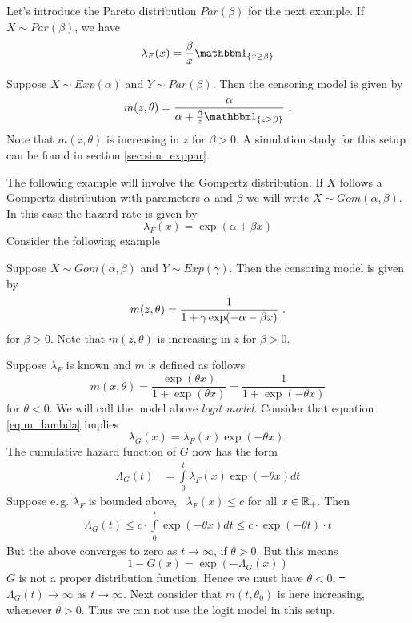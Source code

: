 %
Let's introduce the Pareto distribution $Par(\beta)$ for the next example. If  $X\sim Par(\beta)$, we have
$$\lambda_F(x) = \frac{\beta}{x} \I{x\geq \beta}$$
\begin{example}
	Suppose $X\sim Exp(\alpha)$ and $Y\sim Par(\beta)$. Then the censoring model is given by
	$$m(z, \theta) =\frac{\alpha}{\alpha + \frac{\beta}{z} \I{z \geq \beta}}\mdot$$
	Note that $m(z,\theta)$ is increasing in $z$ for $\beta>0$. A simulation study for this setup can be found in section \ref{sec:sim_exppar}.
\end{example}
%
The following example will involve the Gompertz distribution. If $X$ follows a Gompertz distribution with parameters $\alpha$ and $\beta$ we will write $X\sim Gom(\alpha,\beta)$. In this case the hazard rate is given by
$$\lambda_F(x) = \exp(\alpha + \beta x)$$
Consider the following example
\begin{example}
	Suppose $X\sim Gom(\alpha, \beta)$ and $Y\sim Exp(\gamma)$. Then the censoring model is given by
	$$m(z, \theta) =\frac{1}{1 + \gamma\exp(-\alpha - \beta x)}\textrm{ .}$$
	for $\beta > 0$. Note that $m(z,\theta)$ is increasing in $z$ for $\beta>0$. 
\end{example}
%
\begin{example}
	Suppose $\lambda_F$ is known and $m$ is defined as follows
	$$m(x,\theta) = \frac{\exp(\theta x)}{1+\exp(\theta x)} = \frac{1}{1+\exp(-\theta x)}$$
	for $\theta < 0$. We will call the model above \textit{logit model}. Consider that equation \eqref{eq:m_lambda} implies  
	$$\lambda_G(x) = \lambda_F(x)\exp(-\theta x)\textrm{.}$$
	The cumulative hazard function of $G$ now has the form
	\begin{align*}
		\Lambda_G(t) &= \int\limits_0^t \lambda_F(x)\exp(-\theta x)dt
	\end{align*}
	Suppose e.\,g. $\lambda_F$ is bounded above, \ie\  $\lambda_F(x) \leq c$ for all $x\in \mathbb{R}_+$. Then
	\begin{align*}
		\Lambda_G(t) \leq c\cdot \int\limits_0^t \exp(-\theta x)dt  \leq c\cdot \exp(-\theta t) \cdot t  
	\end{align*}	
	But the above converges to zero as $t\to\infty$, if $\theta>0$. But this means 
	$$1-G(x) = \exp(-\Lambda_G(x))$$
	$G$ is not a proper distribution function. Hence we must have $\theta < 0$, \st\ $\Lambda_G(t) \to \infty$ as $t\to\infty$. Next consider that $m(t,\theta_0)$ is here increasing, whenever $\theta > 0$. Thus we can not use the logit model in this setup. 
\end{example}

